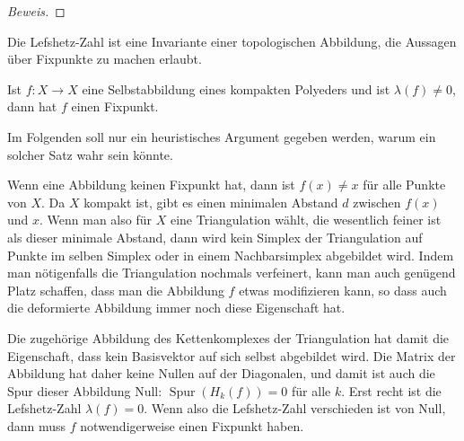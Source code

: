 \begin{proof}[Beweis]
\end{proof}

Die Lefshetz-Zahl ist eine Invariante einer topologischen Abbildung,
die Aussagen über Fixpunkte zu machen erlaubt.

\begin{satz}
Ist $f\colon X\to X$ eine Selbstabbildung eines kompakten Polyeders und
ist $\lambda(f) \ne 0$, dann hat $f$ einen Fixpunkt.
\end{satz}

Im Folgenden soll nur ein heuristisches Argument gegeben werden, warum
ein solcher Satz wahr sein könnte.

Wenn eine Abbildung keinen Fixpunkt hat, dann ist $f(x) \ne x$ für alle
Punkte von $X$.
Da $X$ kompakt ist, gibt es einen minimalen Abstand $d$ zwischen $f(x)$ und $x$.
Wenn man also für $X$ eine Triangulation wählt, die wesentlich feiner ist
als dieser minimale Abstand, dann wird kein Simplex der Triangulation auf
Punkte im selben Simplex oder in einem Nachbarsimplex abgebildet wird.
Indem man nötigenfalls die Triangulation nochmals verfeinert, kann man auch
genügend Platz schaffen, dass man die Abbildung $f$ etwas modifizieren kann,
so dass auch die deformierte Abbildung immer noch diese Eigenschaft hat.

Die zugehörige Abbildung des Kettenkomplexes der Triangulation hat damit
die Eigenschaft, dass kein Basisvektor auf sich selbst abgebildet wird.
Die Matrix der Abbildung hat daher keine Nullen auf der Diagonalen, und
damit ist auch die Spur dieser Abbildung Null: $\operatorname{Spur}(H_k(f))=0$
für alle $k$.
Erst recht ist die Lefshetz-Zahl $\lambda(f)=0$.
Wenn also die Lefshetz-Zahl verschieden ist von Null, dann muss $f$
notwendigerweise einen Fixpunkt haben.

